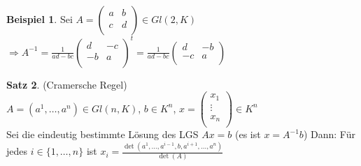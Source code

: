 \documentclass[10pt,a4paper,numbers=endperiod]{scrartcl}
\theoremstyle{definition}
\newtheorem{satz}{Satz}[section]
\newtheorem{bsp}[satz]{Beispiel}
\begin{document}
\begin{bsp}
	Sei $ A = \begin{pmatrix}
	a & b\\
	c & d\\
	\end{pmatrix} \in Gl(2,K)$\\
	$\Rightarrow A^{-1} = \frac{1}{ad-bc} \begin{pmatrix}
	d & -c\\-b & a\\
	\end{pmatrix}^t = \frac{1}{ad-bc} \begin{pmatrix}
	d & -b\\
	-c & a\\
	\end{pmatrix}$
\end{bsp}
	
\begin{satz}
	(Cramersche Regel)\\
	$A = (a^1,\ldots, a^n) \in Gl(n,K)$, $b \in K^n$, $x = \begin{pmatrix}
	x_1\\
	\vdots\\
	x_n\\
	\end{pmatrix} \in K^n$\\
	Sei die eindeutig bestimmte Lösung des LGS $Ax = b$ (es ist $x = A^{-1}b$) 
	Dann: Für jedes $i \in \{1,\ldots,n\}$ ist $x_i = \frac{\det(a^1,\ldots,a^{i-1},b,a^{i+1}, \ldots,a^n)}{\det(A)}$
\end{satz}
\end{document}
